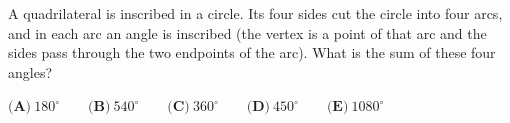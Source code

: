 A quadrilateral is inscribed in a circle. Its four sides cut the circle into four arcs, and in each arc an angle is inscribed (the vertex is a point of that arc and the sides pass through the two endpoints of the arc). What is the sum of these four angles?

$\textbf{(A)}\ 180^\circ \qquad \textbf{(B)}\ 540^\circ \qquad \textbf{(C)}\ 360^\circ \qquad \textbf{(D)}\ 450^\circ\qquad\textbf{(E)}\ 1080^\circ$
